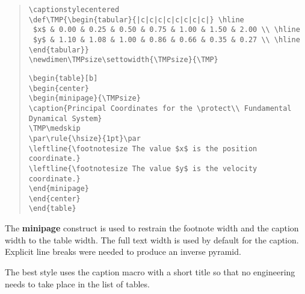 \begin{quote}\footnotesize
\verb"\captionstylecentered" \\
\verb"\def\TMP{\begin{tabular}{|c|c|c|c|c|c|c|c|} \hline" \\
\verb" $x$ & 0.00 & 0.25 & 0.50 & 0.75 & 1.00 & 1.50 & 2.00 \\ \hline" \\
\verb" $y$ & 1.10 & 1.08 & 1.00 & 0.86 & 0.66 & 0.35 & 0.27 \\ \hline" \\
\verb"\end{tabular}}" \\
\verb"\newdimen\TMPsize\settowidth{\TMPsize}{\TMP}"
\par
\verb"\begin{table}[b]" \\
\verb"\begin{center}" \\
\verb"\begin{minipage}{\TMPsize}" \\
\verb"\caption{Principal Coordinates for the \protect\\ Fundamental" \\
\verb"Dynamical System}" \\
\verb"\TMP\medskip" \\
\verb"\par\rule{\hsize}{1pt}\par" \\
\verb"\leftline{\footnotesize The value $x$ is the position coordinate.}" \\
\verb"\leftline{\footnotesize The value $y$ is the velocity coordinate.}" \\
\verb"\end{minipage}" \\
\verb"\end{center}" \\
\verb"\end{table}"
\end{quote}

The {\bf minipage} construct is used to restrain the footnote width and
the caption width to the table width. The full text width is used by
default for the caption. Explicit line breaks were needed to produce an
inverse pyramid.

The best style uses the caption macro with a short title so that no
engineering needs to take place in the list of tables.


